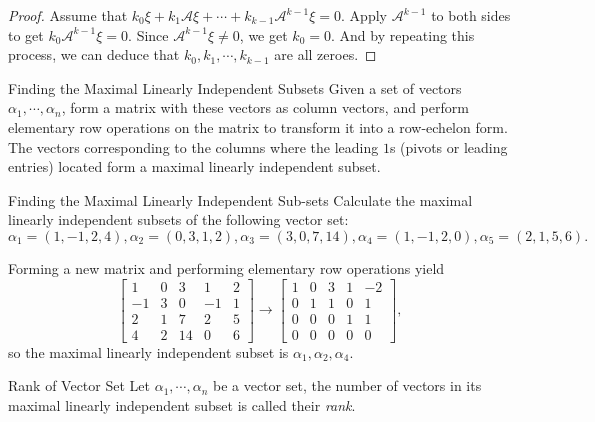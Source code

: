 \begin{proof}
  Assume that $k_0 \xi + k_1 \mathcal{A} \xi + \cdots +
  k_{k-1}\mathcal{A}^{k-1}\xi = 0$.
  Apply $\mathcal{A}^{k-1}$ to both sides to get $k_0 \mathcal{A}^{k-1}\xi = 0$.
  Since $\mathcal{A}^{k-1}\xi \neq 0$,
  we get $k_0 = 0$.
  And by repeating this process, we can deduce that $k_0, k_1, \cdots, k_{k-1}$
  are all zeroes.
\end{proof}

\begin{proposition}{Finding the Maximal Linearly Independent Subsets}{}
  Given a set of vectors $\alpha_1, \cdots, \alpha_n$,
  form a matrix with these vectors as column vectors,
  and perform elementary row operations on the matrix to transform it into a
  row-echelon form.
  The vectors corresponding to the columns where the leading $1$s (pivots or
  leading entries) located form a maximal linearly independent subset.
\end{proposition}

\begin{example}{Finding the Maximal Linearly Independent Sub-sets}{}
  Calculate the maximal linearly independent subsets of the following vector set:
  \begin{equation}
    \alpha_1 = (1, -1, 2, 4), \alpha_2 = (0, 3, 1, 2), \alpha_3 = (3, 0, 7, 14), \alpha_4 = (1, -1, 2, 0), \alpha_5 = (2, 1, 5, 6).
  \end{equation}
\end{example}

\begin{solution}
  Forming a new matrix and performing elementary row operations yield
  \begin{equation}
    \begin{bmatrix}1&0&3&1&2\\-1&3&0&-1&1\\2&1&7&2&5\\4&2&14&0&6\end{bmatrix}\to\begin{bmatrix}1&0&3&1&-2\\0&1&1&0&1\\0&0&0&1&1\\0&0&0&0&0\end{bmatrix},
  \end{equation}
  so the maximal linearly independent subset is $\alpha_1, \alpha_2, \alpha_4$.
\end{solution}

\begin{definition}{Rank of Vector Set}{}
  Let $\alpha_1, \cdots, \alpha_n$ be a vector set,
  the number of vectors in its maximal linearly independent subset is called
  their \emph{rank}.
\end{definition}

